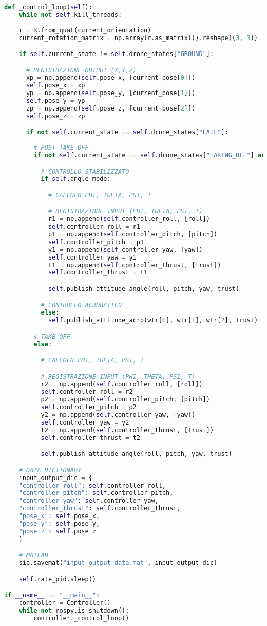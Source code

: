 \begin{lstlisting}[language=Python, numbers=none]
  def _control_loop(self):
    while not self.kill_threads:
    
    r = R.from_quat(current_orientation)
    current_rotation_matrix = np.array(r.as_matrix()).reshape((3, 3))

    if self.current_state != self.drone_states["GROUND"]:

      # REGISTRAZIONE OUTPUT (X,Y,Z)
      xp = np.append(self.pose_x, [current_pose[0]])
      self.pose_x = xp
      yp = np.append(self.pose_y, [current_pose[1]])
      self.pose_y = yp
      zp = np.append(self.pose_z, [current_pose[2]])
      self.pose_z = zp

      if not self.current_state == self.drone_states["FAIL"]:
                    
        # POST TAKE OFF
        if not self.current_state == self.drone_states["TAKING_OFF"] and self.control_pitch_roll:

          # CONTROLLO STABILIZZATO
          if self.angle_mode:

            # CALCOLO PHI, THETA, PSI, T

            # REGISTRAZIONE INPUT (PHI, THETA, PSI, T)
            r1 = np.append(self.controller_roll, [roll])
            self.controller_roll = r1
            p1 = np.append(self.controller_pitch, [pitch])
            self.controller_pitch = p1
            y1 = np.append(self.controller_yaw, [yaw])
            self.controller_yaw = y1
            t1 = np.append(self.controller_thrust, [trust])
            self.controller_thrust = t1

            self.publish_attitude_angle(roll, pitch, yaw, trust)

          # CONTROLLO ACROBATICO    
          else:
            self.publish_attitude_acro(wtr[0], wtr[1], wtr[2], trust)

        # TAKE OFF        
        else:

          # CALCOLO PHI, THETA, PSI, T

          # REGISTRAZIONE INPUT (PHI, THETA, PSI, T)
          r2 = np.append(self.controller_roll, [roll])
          self.controller_roll = r2
          p2 = np.append(self.controller_pitch, [pitch])
          self.controller_pitch = p2
          y2 = np.append(self.controller_yaw, [yaw])
          self.controller_yaw = y2
          t2 = np.append(self.controller_thrust, [trust])
          self.controller_thrust = t2

          self.publish_attitude_angle(roll, pitch, yaw, trust)

    # DATA DICTIONARY        
    input_output_dic = {
    "controller_roll": self.controller_roll,
    "controller_pitch": self.controller_pitch,
    "controller_yaw": self.controller_yaw,
    "controller_thrust": self.controller_thrust,
    "pose_x": self.pose_x,
    "pose_y": self.pose_y,
    "pose_z": self.pose_z
    }

    # MATLAB
    sio.savemat("input_output_data.mat", input_output_dic)

    self.rate_pid.sleep()

if __name__ == "__main__":
    controller = Controller()
    while not rospy.is_shutdown():
        controller._control_loop()
\end{lstlisting}
